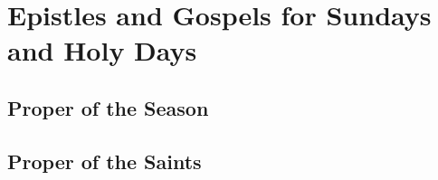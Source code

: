 \def\tabmark{Readings}

\newcommand\bibleref[2]{\parbox{\columnwidth}{{\large\scshape{#1}}\hfill{\footnotesize #2}}\nobreak}
\newcommand\challnote[1]{}


\chapter{Epistles and Gospels for Sundays and Holy Days}

\section{Proper of the Season}

\begin{multicols}{2}

\small




\end{multicols}

\section{Proper of the Saints}

\begin{multicols}{2}

\small



\end{multicols}


\vfill

